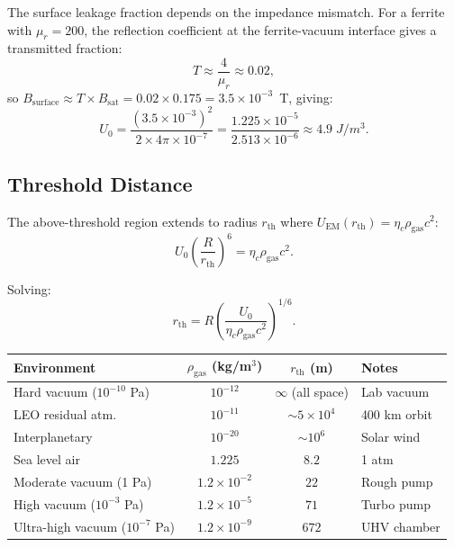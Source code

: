 \documentclass[amsmath,amssymb,aps,prd,superscriptaddress,nofootinbib]{revtex4-2}
\begin{document}
The surface leakage fraction depends on the impedance mismatch. For a
ferrite with $\mu_r = 200$, the reflection coefficient at the ferrite-vacuum
interface gives a transmitted fraction:
\begin{equation}
T \approx \frac{4}{\mu_r} \approx 0.02,
\end{equation}
so $B_\text{surface} \approx T \times B_\text{sat} = 0.02 \times 0.175
= 3.5 \times 10^{-3}$~T, giving:
\begin{equation}
U_0 = \frac{(3.5 \times 10^{-3})^2}{2 \times 4\pi \times 10^{-7}}
     = \frac{1.225 \times 10^{-5}}{2.513 \times 10^{-6}}
     \approx 4.9 \; \si{J/m^3}.
\end{equation}

\subsection{Threshold Distance}\label{sec:threshold-distance}

The above-threshold region extends to radius $r_\text{th}$ where
$U_\text{EM}(r_\text{th}) = \eta_c \rho_\text{gas} c^2$:
\begin{equation}
U_0 \left(\frac{R}{r_\text{th}}\right)^6 = \eta_c \rho_\text{gas} c^2.
\end{equation}

Solving:
\begin{equation}\label{eq:r-threshold}
\boxed{
r_\text{th} = R \left(\frac{U_0}{\eta_c \rho_\text{gas} c^2}\right)^{1/6}.
}
\end{equation}

\begin{center}
\begin{tabular}{lccl}
\toprule
Environment & $\rho_\text{gas}$ (kg/m$^3$) & $r_\text{th}$ (m) & Notes \\
\midrule
Hard vacuum ($10^{-10}$ Pa) & $10^{-12}$ & $\infty$ (all space) & Lab vacuum \\
LEO residual atm.\ & $10^{-11}$ & $\sim 5 \times 10^4$ & 400 km orbit \\
Interplanetary & $10^{-20}$ & $\sim 10^6$ & Solar wind \\
Sea level air & $1.225$ & $8.2$ & 1 atm \\
Moderate vacuum (1 Pa) & $1.2 \times 10^{-2}$ & $22$ & Rough pump \\
High vacuum ($10^{-3}$ Pa) & $1.2 \times 10^{-5}$ & $71$ & Turbo pump \\
Ultra-high vacuum ($10^{-7}$ Pa) & $1.2 \times 10^{-9}$ & $672$ & UHV chamber \\
\bottomrule
\end{tabular}
\end{center}
\end{document}
